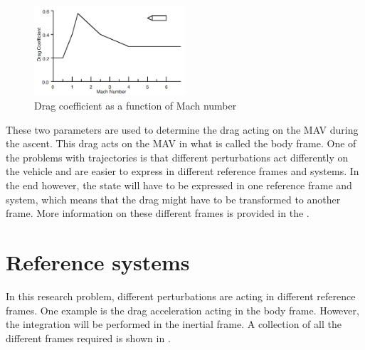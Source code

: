 \begin{figure}[H]
\centering
\includegraphics[width=0.5\textwidth]{figures/launcher_methods/dragcoeff_whitehead2004mars.jpg}
\caption{Drag coefficient as a function of Mach number \cite{whitehead2004mars}}
\label{fig:dragcoeff_whitehead2004mars}
\end{figure}

\noindent
These two parameters are used to determine the drag acting on the \ac{MAV} during the ascent. This drag acts on the \ac{MAV} in what is called the body frame. One of the problems with trajectories is that different perturbations act differently on the vehicle and are easier to express in different reference frames and systems. In the end however, the state will have to be expressed in one reference frame and system, which means that the drag might have to be transformed to another frame. More information on these different frames is provided in the .




\section{Reference systems}
\label{sec:referenceSystems}
In this research problem, different perturbations are acting in different reference frames. One example is the drag acceleration acting in the body frame. However, the integration will be performed in the inertial frame. A collection of all the different frames required is shown in .



